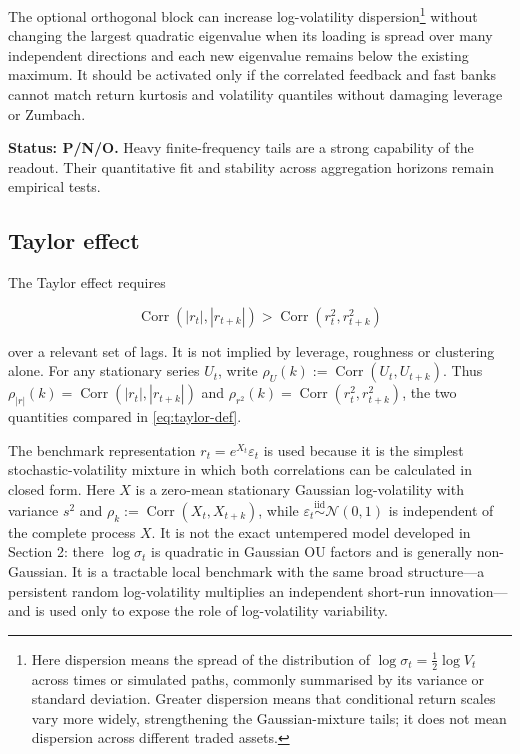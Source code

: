 \documentclass[11pt,a4paper]{article}
\newcommand{\Corr}{\operatorname{Corr}}
\begin{document}
The optional orthogonal block can increase log-volatility dispersion\footnote{Here dispersion
means the spread of the distribution of \(\log\sigma_t=\tfrac12\log V_t\) across times or
simulated paths, commonly summarised by its variance or standard deviation.  Greater dispersion
means that conditional return scales vary more widely, strengthening the Gaussian-mixture tails;
it does not mean dispersion across different traded assets.} without changing the
largest quadratic eigenvalue when its loading is spread over many independent directions and
each new eigenvalue remains below the existing maximum. It should be activated only if the
correlated feedback and fast banks cannot match return kurtosis and volatility quantiles
without damaging leverage or Zumbach.

\textbf{Status: P/N/O.} Heavy finite-frequency tails are a strong capability of the readout.
Their quantitative fit and stability across aggregation horizons remain empirical tests.

\subsection{Taylor effect}

The Taylor effect requires

\begin{equation}
\Corr(|r_t|,|r_{t+k}|)
>\Corr(r_t^2,r_{t+k}^2)
\label{eq:taylor-def}
\end{equation}

over a relevant set of lags. It is not implied by leverage, roughness or clustering alone.
For any stationary series \(U_t\), write
\(\rho_U(k):=\Corr(U_t,U_{t+k})\).  Thus
\(\rho_{|r|}(k)=\Corr(|r_t|,|r_{t+k}|)\) and
\(\rho_{r^2}(k)=\Corr(r_t^2,r_{t+k}^2)\), the two quantities compared in
\cref{eq:taylor-def}.

The benchmark representation \(r_t=e^{X_t}\varepsilon_t\) is used because it is the simplest
stochastic-volatility mixture in which both correlations can be calculated in closed form.
Here \(X\) is a zero-mean stationary Gaussian log-volatility with variance \(s^2\) and
\(\rho_k:=\Corr(X_t,X_{t+k})\), while
\(\varepsilon_t\stackrel{\mathrm{iid}}{\sim}\mathcal N(0,1)\) is independent of the complete
process \(X\).  It is not the exact untempered model developed in Section 2: there
\(\log\sigma_t\) is quadratic in Gaussian OU factors and is generally non-Gaussian.  It is a
tractable local benchmark with the same broad structure---a persistent random log-volatility
multiplies an independent short-run innovation---and is used only to expose the role of
log-volatility variability.
\end{document}
